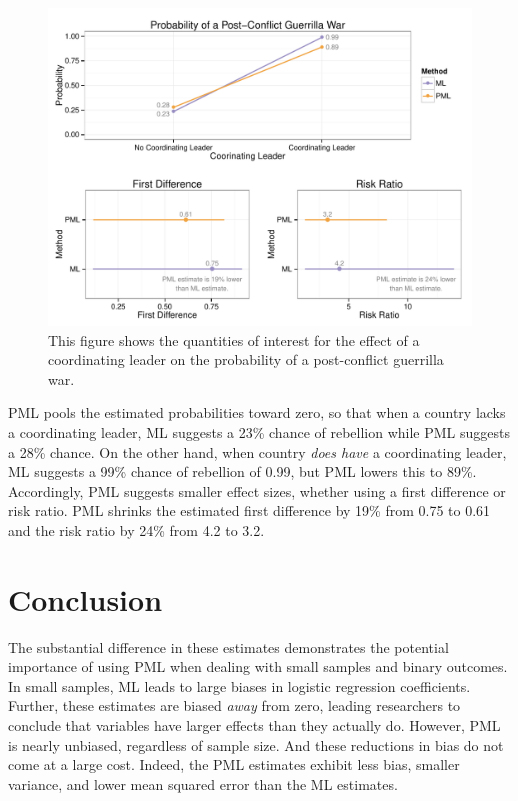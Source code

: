 \documentclass[12pt]{article}
\begin{document}
\begin{figure}[H]
\begin{center}
\includegraphics[width = \textwidth]{figs/weisiger-qis.pdf}
\caption{This figure shows the quantities of interest for the effect of a coordinating leader on the probability of a post-conflict guerrilla war.}\label{fig:weisiger-qis}
\end{center}
\end{figure}

PML pools the estimated probabilities toward zero, so that when a country lacks a coordinating leader, ML suggests a 23\% chance of rebellion while PML suggests a 28\% chance. 
On the other hand, when country \textit{does have} a coordinating leader, ML suggests a 99\% chance of rebellion of 0.99, but PML lowers this to 89\%. 
Accordingly, PML suggests smaller effect sizes, whether using a first difference or risk ratio. 
PML shrinks the estimated first difference by 19\% from 0.75 to 0.61 and the risk ratio by 24\% from 4.2 to 3.2.

\section*{Conclusion}

The substantial difference in these estimates demonstrates the potential importance of using PML when dealing with small samples and binary outcomes.
In small samples, ML leads to large biases in logistic regression coefficients. 
Further, these estimates are biased \textit{away} from zero, leading researchers to conclude that variables have larger effects than they actually do. 
However, PML is nearly unbiased, regardless of sample size. 
And these reductions in bias do not come at a large cost. 
Indeed, the PML estimates exhibit less bias, smaller variance, and lower mean squared error than the ML estimates.
\end{document}
